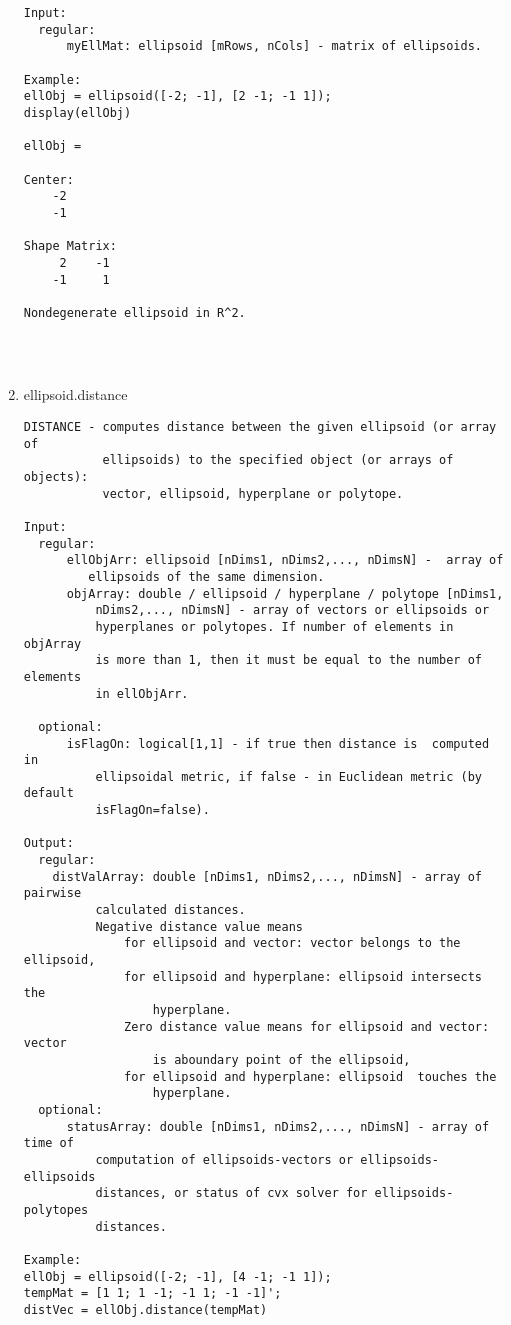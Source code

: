 \begin{enumerate}
\begin{lstlisting}
Input:
  regular:
      myEllMat: ellipsoid [mRows, nCols] - matrix of ellipsoids.

Example:
ellObj = ellipsoid([-2; -1], [2 -1; -1 1]);
display(ellObj)

ellObj =

Center:
    -2
    -1

Shape Matrix:
     2    -1
    -1     1

Nondegenerate ellipsoid in R^2.




\end{lstlisting}
\fontfamily{\familydefault}
\selectfont
\item {ellipsoid.distance}
\selectfont
\begin{lstlisting}
DISTANCE - computes distance between the given ellipsoid (or array of
           ellipsoids) to the specified object (or arrays of objects):
           vector, ellipsoid, hyperplane or polytope.

Input:
  regular:
      ellObjArr: ellipsoid [nDims1, nDims2,..., nDimsN] -  array of
         ellipsoids of the same dimension.
      objArray: double / ellipsoid / hyperplane / polytope [nDims1,
          nDims2,..., nDimsN] - array of vectors or ellipsoids or
          hyperplanes or polytopes. If number of elements in objArray
          is more than 1, then it must be equal to the number of elements
          in ellObjArr.

  optional:
      isFlagOn: logical[1,1] - if true then distance is  computed in
          ellipsoidal metric, if false - in Euclidean metric (by default
          isFlagOn=false).

Output:
  regular:
    distValArray: double [nDims1, nDims2,..., nDimsN] - array of pairwise
          calculated distances.
          Negative distance value means
              for ellipsoid and vector: vector belongs to the ellipsoid,
              for ellipsoid and hyperplane: ellipsoid intersects the
                  hyperplane.
              Zero distance value means for ellipsoid and vector: vector
                  is aboundary point of the ellipsoid,
              for ellipsoid and hyperplane: ellipsoid  touches the
                  hyperplane.
  optional:
      statusArray: double [nDims1, nDims2,..., nDimsN] - array of time of
          computation of ellipsoids-vectors or ellipsoids-ellipsoids
          distances, or status of cvx solver for ellipsoids-polytopes
          distances.

Example:
ellObj = ellipsoid([-2; -1], [4 -1; -1 1]);
tempMat = [1 1; 1 -1; -1 1; -1 -1]';
distVec = ellObj.distance(tempMat)


\end{lstlisting}
\end{enumerate}
